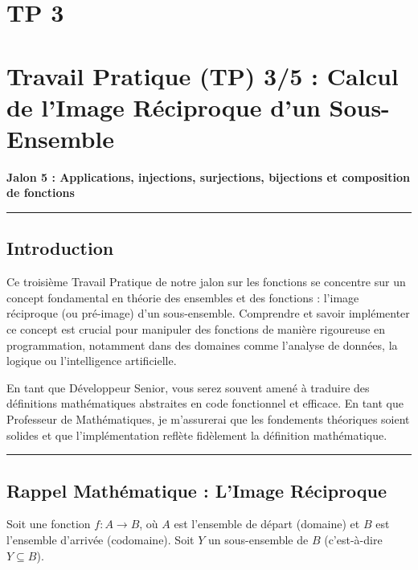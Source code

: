 \documentclass[12pt,a4paper]{report}
\begin{document}
\section{TP 3}
\section{Travail Pratique (TP) 3/5 : Calcul de l'Image Réciproque d'un
Sous-Ensemble}\label{travail-pratique-tp-35-calcul-de-limage-ruxe9ciproque-dun-sous-ensemble}

\textbf{Jalon 5 : Applications, injections, surjections, bijections et
composition de fonctions}

\begin{center}\rule{0.5\linewidth}{0.5pt}\end{center}

\subsection{Introduction}\label{introduction}

Ce troisième Travail Pratique de notre jalon sur les fonctions se
concentre sur un concept fondamental en théorie des ensembles et des
fonctions : l'image réciproque (ou pré-image) d'un sous-ensemble.
Comprendre et savoir implémenter ce concept est crucial pour manipuler
des fonctions de manière rigoureuse en programmation, notamment dans des
domaines comme l'analyse de données, la logique ou l'intelligence
artificielle.

En tant que Développeur Senior, vous serez souvent amené à traduire des
définitions mathématiques abstraites en code fonctionnel et efficace. En
tant que Professeur de Mathématiques, je m'assurerai que les fondements
théoriques soient solides et que l'implémentation reflète fidèlement la
définition mathématique.

\begin{center}\rule{0.5\linewidth}{0.5pt}\end{center}

\subsection{Rappel Mathématique : L'Image
Réciproque}\label{rappel-mathuxe9matique-limage-ruxe9ciproque}

Soit une fonction \(f: A \to B\), où \(A\) est l'ensemble de départ
(domaine) et \(B\) est l'ensemble d'arrivée (codomaine). Soit \(Y\) un
sous-ensemble de \(B\) (c'est-à-dire \(Y \subseteq B\)).
\end{document}
